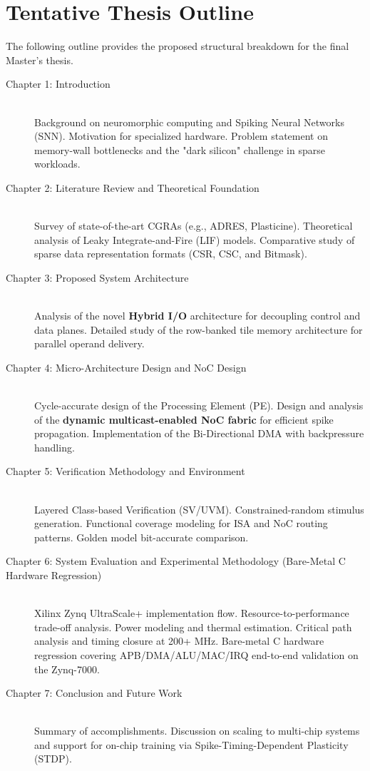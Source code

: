 \section{Tentative Thesis Outline}

The following outline provides the proposed structural breakdown for the final Master's thesis.

\begin{description}
    \item[Chapter 1: Introduction] \hfill \\
    Background on neuromorphic computing and Spiking Neural Networks (SNN). Motivation for specialized hardware. Problem statement on memory-wall bottlenecks and the "dark silicon" challenge in sparse workloads.
    
    \item[Chapter 2: Literature Review and Theoretical Foundation] \hfill \\
    Survey of state-of-the-art CGRAs (e.g., ADRES, Plasticine). Theoretical analysis of Leaky Integrate-and-Fire (LIF) models. Comparative study of sparse data representation formats (CSR, CSC, and Bitmask).
    
    \item[Chapter 3: Proposed System Architecture] \hfill \\
    Analysis of the novel \textbf{Hybrid I/O} architecture for decoupling control and data planes. Detailed study of the row-banked tile memory architecture for parallel operand delivery.
    
    \item[Chapter 4: Micro-Architecture Design and NoC Design] \hfill \\
    Cycle-accurate design of the Processing Element (PE). Design and analysis of the \textbf{dynamic multicast-enabled NoC fabric} for efficient spike propagation. Implementation of the Bi-Directional DMA with backpressure handling.
    
    \item[Chapter 5: Verification Methodology and Environment] \hfill \\
    Layered Class-based Verification (SV/UVM). Constrained-random stimulus generation. Functional coverage modeling for ISA and NoC routing patterns. Golden model bit-accurate comparison.
    
    \item[Chapter 6: System Evaluation and Experimental Methodology (Bare-Metal C Hardware Regression)] \hfill \\
    Xilinx Zynq UltraScale+ implementation flow. Resource-to-performance trade-off analysis. Power modeling and thermal estimation. Critical path analysis and timing closure at 200+ MHz. Bare-metal C hardware regression covering APB/DMA/ALU/MAC/IRQ end-to-end validation on the Zynq-7000.
    
    \item[Chapter 7: Conclusion and Future Work] \hfill \\
    Summary of accomplishments. Discussion on scaling to multi-chip systems and support for on-chip training via Spike-Timing-Dependent Plasticity (STDP).
\end{description}

